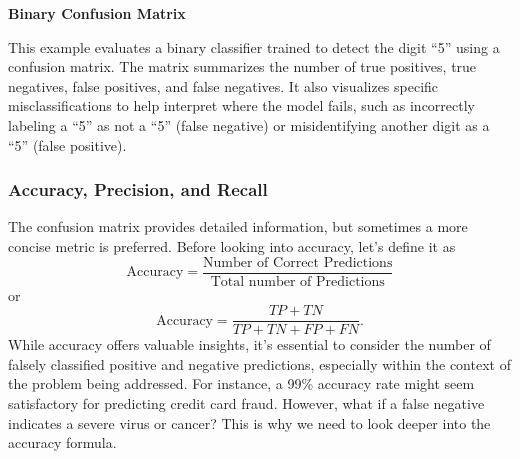 \documentclass[12pt,letter]{article}
\begin{document}
\begin{example}
\textbf{Binary Confusion Matrix}

\noindent This example evaluates a binary classifier trained to detect the digit ``5'' using a confusion matrix. The matrix summarizes the number of true positives, true negatives, false positives, and false negatives. It also visualizes specific misclassifications to help interpret where the model fails, such as incorrectly labeling a ``5'' as not a ``5'' (false negative) or misidentifying another digit as a ``5'' (false positive).
\end{example}



\subsubsection{Accuracy, Precision, and Recall}
The confusion matrix provides detailed information, but sometimes a more concise metric is preferred. Before looking into accuracy, let's define it as
\begin{equation}
\text{Accuracy} = \frac{\text{Number of Correct Predictions}}{\text{Total number of Predictions}}
\end{equation}
or
\begin{equation}
\text{Accuracy} = \frac{TP+TN}{TP+TN+FP+FN}.
\end{equation}
While accuracy offers valuable insights, it's essential to consider the number of falsely classified positive and negative predictions, especially within the context of the problem being addressed. For instance, a 99\% accuracy rate might seem satisfactory for predicting credit card fraud. However, what if a false negative indicates a severe virus or cancer? This is why we need to look deeper into the accuracy formula.
\end{document}
